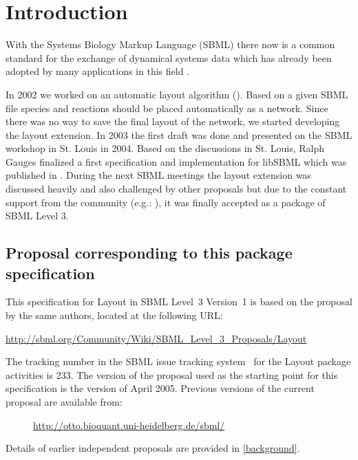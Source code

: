 \section{Introduction}

With the Systems Biology Markup Language (SBML) there now is a common 
standard for the exchange of dynamical systems data which has already 
been adopted by many applications in this field 
\cite{SBMLWebsite,sbml3core,SBMLArticle}. 

In 2002 we worked on an automatic layout algorithm (\cite{Wegner2005}). 
Based on a given SBML file species and reactions should be placed 
automatically as a network. Since there was no way to save the final 
layout of the network, we started developing the layout extension. In 
2003 the first draft was done and presented on the SBML workshop in St. 
Louis in 2004. Based on the discussions in St. Louis, Ralph Gauges 
finalized a first specification and implementation for libSBML which was 
published in \cite{Gauges01082006}. During the next SBML meetings the 
layout extension was discussed heavily and also challenged by other 
proposals but due to the constant support from the community (e.g.: 
\cite{Deckard01122006}), it was finally accepted as a package of SBML 
Level 3. 

\subsection{Proposal corresponding to this package specification}

This specification for Layout in SBML Level~3
Version~1 is based on the proposal by the same authors, located at the
following URL:

\begin{center}
  \vspace*{1ex}\small
  \url{http://sbml.org/Community/Wiki/SBML_Level_3_Proposals/Layout}
  \vspace*{1ex}
\end{center}

The tracking number in the SBML issue tracking system~\citep{tracker}
for the Layout package activities is 233.  The
version of the proposal used as the starting point for this
specification is the version of April 2005. Previous versions of the current 
proposal are available from:
\begin{description}
  \item [] \small{\url{http://otto.bioquant.uni-heidelberg.de/sbml/}}  
\end{description}
Details of earlier independent proposals are provided in \ref{background}.

